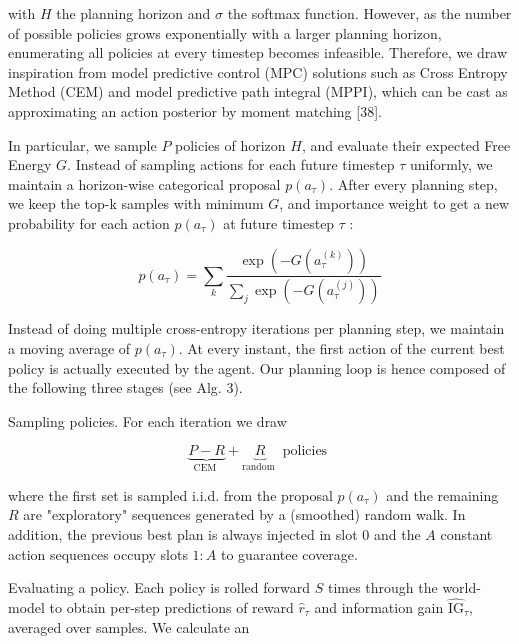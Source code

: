 \documentclass[10pt]{article}
\begin{document}
with $H$ the planning horizon and $\sigma$ the softmax function. However, as the number of possible policies grows exponentially with a larger planning horizon, enumerating all policies at every timestep becomes infeasible. Therefore, we draw inspiration from model predictive control (MPC) solutions such as Cross Entropy Method (CEM) and model predictive path integral (MPPI), which can be cast as approximating an action posterior by moment matching [38].

In particular, we sample $P$ policies of horizon $H$, and evaluate their expected Free Energy $G$. Instead of sampling actions for each future timestep $\tau$ uniformly, we maintain a horizon-wise categorical proposal $p\left(a_{\tau}\right)$. After every planning step, we keep the top-k samples with minimum $G$, and importance weight to get a new probability for each action $p\left(a_{\tau}\right)$ at future timestep $\tau$ :


\begin{equation*}
p\left(a_{\tau}\right)=\sum_{k} \frac{\exp \left(-G\left(a_{\tau}^{(k)}\right)\right)}{\sum_{j} \exp \left(-G\left(a_{\tau}^{(j)}\right)\right)} \tag{58}
\end{equation*}


Instead of doing multiple cross-entropy iterations per planning step, we maintain a moving average of $p\left(a_{\tau}\right)$. At every instant, the first action of the current best policy is actually executed by the agent. Our planning loop is hence composed of the following three stages (see Alg. 3).

Sampling policies. For each iteration we draw

$$
\underbrace{P-R}_{\text {CEM }}+\underbrace{R}_{\text {random }} \text { policies }
$$

where the first set is sampled i.i.d. from the proposal $p\left(a_{\tau}\right)$ and the remaining $R$ are "exploratory" sequences generated by a (smoothed) random walk. In addition, the previous best plan is always injected in slot 0 and the $A$ constant action sequences occupy slots $1: A$ to guarantee coverage.

Evaluating a policy. Each policy is rolled forward $S$ times through the world-model to obtain per-step predictions of reward $\hat{r}_{\tau}$ and information gain $\widehat{\mathrm{IG}}_{\tau}$, averaged over samples. We calculate an
\end{document}
